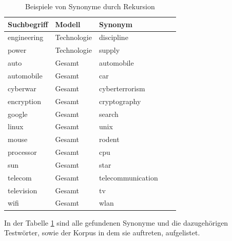 \documentclass[12pt,a4paper]{report}
\begin{document}
\begin{table}[H]
\caption{Beispiele von Synonyme durch Rekursion}
\label{tab:bspsynoyme}
\begin{center}
\begin{tabular}{|l||l|l|l|l|}
\hline
\textbf{Suchbegriff} & \textbf{Modell} & \textbf{Synonym}   \\

\hline
 engineering & Technologie & discipline \\
 \hline	
 power	& Technologie	& supply	\\
 \hline
 \hline
auto & Gesamt & automobile\\
\hline
automobile & Gesamt & car\\
\hline
cyberwar & Gesamt & cyberterrorism\\
\hline
encryption & Gesamt & cryptography\\
\hline
google & Gesamt & search\\
\hline
linux & Gesamt & unix\\
\hline
mouse & Gesamt & rodent\\
\hline
processor & Gesamt & cpu\\
\hline
sun & Gesamt & star\\
\hline
telecom & Gesamt & telecommunication\\
\hline
television & Gesamt & tv\\
\hline
wifi & Gesamt & wlan\\
 	\hline
 
\end{tabular}
\end{center}
\end{table}
		
 In der Tabelle \ref{tab:bspsynoyme} sind alle gefundenen Synonyme und die dazugehörigen Testwörter, sowie der Korpus in dem sie auftreten, aufgelistet.
		
\end{document}

